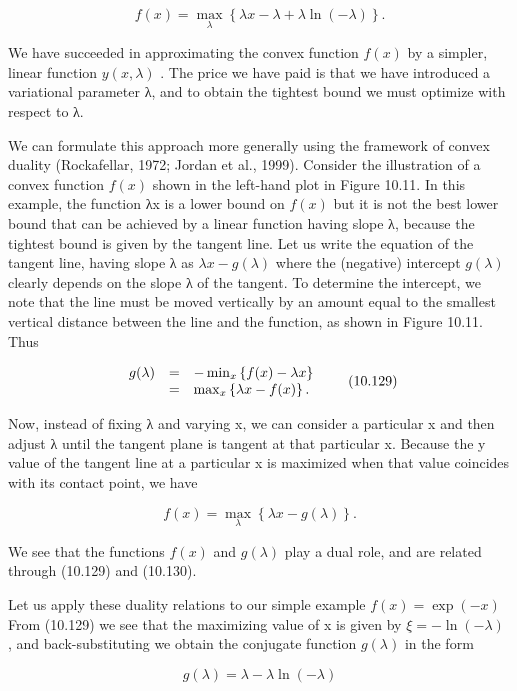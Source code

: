 \documentclass[
  10
]{article}
\begin{document}
\[
f (x) = \max _ {\lambda} \left\{\lambda x - \lambda + \lambda \ln (- \lambda) \right\}.\tag{10.128}
\]

We have succeeded in approximating the convex function \(f ( x )\) by a
simpler, linear function \(y ( x , \lambda )\) . The price we have paid
is that we have introduced a variational parameter λ, and to obtain the
tightest bound we must optimize with respect to λ.

We can formulate this approach more generally using the framework of
convex duality (Rockafellar, 1972; Jordan et al., 1999). Consider the
illustration of a convex function \(f ( x )\) shown in the left-hand
plot in Figure 10.11. In this example, the function λx is a lower bound
on \(f ( x )\) but it is not the best lower bound that can be achieved
by a linear function having slope λ, because the tightest bound is given
by the tangent line. Let us write the equation of the tangent line,
having slope λ as \(\lambda x - g ( \lambda )\) where the (negative)
intercept \(g ( \lambda )\) clearly depends on the slope λ of the
tangent. To determine the intercept, we note that the line must be moved
vertically by an amount equal to the smallest vertical distance between
the line and the function, as shown in Figure 10.11. Thus

\[
\begin{array}{r c l} g (\lambda) & = & - \min _ {x} \left\{f (x) - \lambda x \right\} \\ & = & \max _ {x} \left\{\lambda x - f (x) \right\}. \end{array}\tag{10.129}
\]

Now, instead of fixing λ and varying x, we can consider a particular x
and then adjust λ until the tangent plane is tangent at that particular
x. Because the y value of the tangent line at a particular x is
maximized when that value coincides with its contact point, we have

\[
f (x) = \max _ {\lambda} \left\{\lambda x - g (\lambda) \right\}.\tag{10.130}
\]

We see that the functions \(f ( x )\) and \(g ( \lambda )\) play a dual
role, and are related through (10.129) and (10.130).

Let us apply these duality relations to our simple example
\(f ( x ) = \exp ( - x )\) From (10.129) we see that the maximizing
value of x is given by \(\xi = - \ln ( - \lambda )\) , and
back-substituting we obtain the conjugate function \(g ( \lambda )\) in
the form

\[
g (\lambda) = \lambda - \lambda \ln (- \lambda)\tag{10.131}
\]
\end{document}
